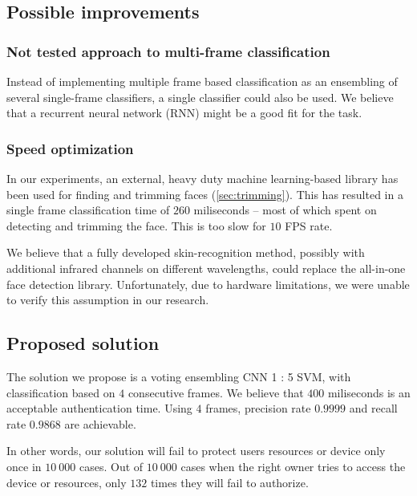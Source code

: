     \subsection*{Possible improvements}

    \subsubsection*{Not tested approach to multi-frame classification}
    Instead of implementing multiple frame based classification as an ensembling
    of several single-frame classifiers, a single classifier could also be used.
    We believe that a recurrent neural network (RNN) might be a good fit for the
    task.

    \subsubsection*{Speed optimization}
    In our experiments, an external, heavy duty machine learning-based library
    has been used for finding and trimming faces (\ref{sec:trimming}). This has
    resulted in a single frame classification time of $260$ miliseconds -- most of
    which spent on detecting and trimming the face. This is too slow for $10$ FPS
    rate.

    We believe that a fully developed skin-recognition method, possibly with
    additional infrared channels on different wavelengths, could replace the
    all-in-one face detection library. Unfortunately, due to hardware limitations,
    we were unable to verify this assumption in our research.

    \subsection{Proposed solution}
    The solution we propose is a voting ensembling CNN 1 : 5 SVM, with
    classification based on $4$ consecutive frames. We believe that $400$ miliseconds
    is an acceptable authentication time. Using $4$ frames, precision rate $0.9999$
    and recall rate $0.9868$ are achievable.

    In other words, our solution will fail to protect users resources or device
    only once in $10\ 000$ cases. Out of $10\ 000$ cases when the right owner
    tries to access the device or resources, only $132$ times they will fail
    to authorize.
